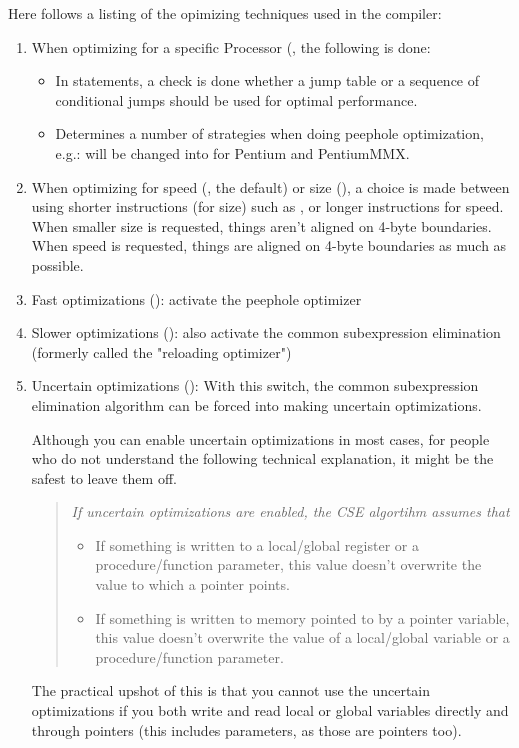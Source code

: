 \documentclass{report}
\begin{document}
Here follows a listing of the opimizing techniques used in the compiler:
\begin{enumerate}
\item When optimizing for a specific Processor (,
the following is done:
\begin{itemize}
\item In  statements, a check is done whether a jump table
or a sequence of conditional jumps should be used for optimal performance.
\item Determines a number of strategies when doing peephole optimization, e.g.:
 will be changed into
 for Pentium and PentiumMMX.
\end{itemize}
\item When optimizing for speed (, the default) or size (), a choice is
made between using shorter instructions (for size) such as ,
or longer instructions  for speed. When smaller size is
requested, things aren't aligned on 4-byte boundaries.  When speed is
requested, things are aligned on 4-byte boundaries as much as possible.
\item Fast optimizations (): activate the peephole optimizer
\item Slower optimizations (): also activate the common subexpression
elimination (formerly called the "reloading optimizer")
\item Uncertain optimizations (): With this switch, the common subexpression
elimination algorithm can be forced into making uncertain optimizations.

Although you can enable uncertain optimizations in most cases, for people who
do not understand the following technical explanation, it might be the safest to
leave them off.

\begin{quote}
\em
If uncertain optimizations are enabled, the CSE algortihm assumes
that
\begin{itemize}
\item If something is written to a local/global register or a
procedure/function parameter, this value doesn't overwrite the value to
which a pointer points.
\item If something is written to memory pointed to by a pointer variable,
this value doesn't overwrite the value of a local/global variable or a
procedure/function parameter.
\end{itemize}
\end{quote}
The practical upshot of this is that you cannot use the uncertain
optimizations if you both write and read local or global variables directly and
through pointers (this includes  parameters, as those are pointers too).


\end{enumerate}
\end{document}
